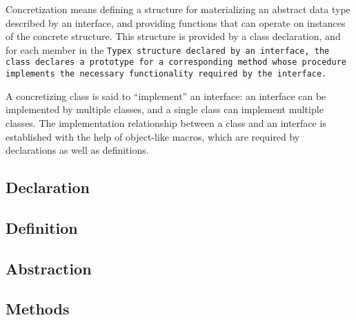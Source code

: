 \def\Subsection#1{\subsection{#1}}

Concretization means defining a structure for materializing
an abstract data type described by an interface, and providing
functions that can operate on instances of the concrete structure.
This structure is provided by a class declaration,
and for each member in the \tt{Typex} structure declared by an interface,
the class declares a prototype for a corresponding method whose procedure
implements the necessary functionality required by the interface.

A concretizing class is said to ``implement'' an interface: an interface can be
implemented by multiple classes, and a single class can implement multiple classes.
The implementation relationship between a class and an
interface is established with the help of object-like macros,
which are required by declarations as well as definitions.

\Subsection{Declaration}

\Subsection{Definition}

\Subsection{Abstraction}

\Subsection{Methods}
